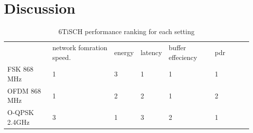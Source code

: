\documentclass[journal]{IEEEtran}
\newcommand{\fsk}          {FSK 868 MHz }
\newcommand{\oqpsk}        {O-QPSK 2.4GHz }
\newcommand{\ofdm}         {OFDM 868 MHz }
\begin{document}
\section{Discussion}
\label{sec:discussion}
\begin{table}[t]
 \caption {6TiSCH performance ranking for each setting} \label{tab:summary}
\begin{tabular}{lllllllll}
      & network fomration speed. & energy & latency & buffer effeciency & pdr &  &  &  \\
\fsk   & 1                        & 3      & 1       & 1                 & 1   &  &  &  \\
\ofdm  & 1                        & 2      & 2       & 1                 & 2   &  &  &  \\
\oqpsk & 3                        & 1      & 3       & 2                 & 1   &  &  & 
\end{tabular}
\end{table}




\printbibliography

\end{document}
